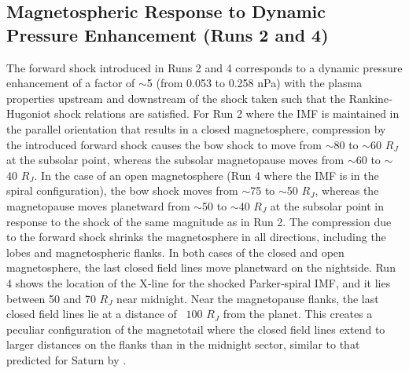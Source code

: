 \subsection{Magnetospheric Response to Dynamic Pressure Enhancement (Runs 2 and 4)}

The forward shock introduced in Runs 2 and 4 corresponds to a dynamic pressure enhancement of a factor of $\sim$5 (from 0.053 to 0.258 nPa) with the plasma properties upstream and downstream of the shock taken such that the Rankine‐Hugoniot shock relations are satisfied. For Run 2 where the IMF is maintained in the parallel orientation that results in a closed magnetosphere, compression by the introduced forward shock causes the bow shock to move from $\sim$80 to $\sim$60 $R_J$ at the subsolar point, whereas the subsolar magnetopause moves from $\sim$60 to $\sim$40 $R_J$. In the case of an open magnetosphere (Run 4 where the IMF is in the spiral configuration), the bow shock moves from $\sim$75 to $\sim$50 $R_J$, whereas the magnetopause moves planetward from $\sim$50 to $\sim$40 $R_J$ at the subsolar point in response to the shock of the same magnitude as in Run 2. The compression due to the forward shock shrinks the magnetosphere in all directions, including the lobes and magnetospheric flanks. In both cases of the closed and open magnetosphere, the last closed field lines move planetward on the nightside. Run 4 shows the location of the X‐line for the shocked Parker‐spiral IMF, and it lies between 50 and 70 $R_J$ near midnight. Near the magnetopause flanks, the last closed field lines lie at a distance of ~$100$ $R_J$ from the planet. This creates a peculiar configuration of the magnetotail where the closed field lines extend to larger distances on the flanks than in the midnight sector, similar to that predicted for Saturn by \cite{Jia2012}.

